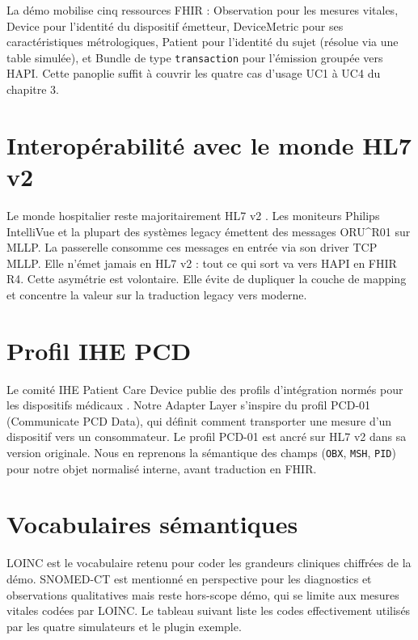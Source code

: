 La démo mobilise cinq ressources FHIR : Observation pour les mesures vitales, Device pour l'identité du dispositif émetteur, DeviceMetric pour ses caractéristiques métrologiques, Patient pour l'identité du sujet (résolue via une table simulée), et Bundle de type \texttt{transaction} pour l'émission groupée vers HAPI. Cette panoplie suffit à couvrir les quatre cas d'usage UC1 à UC4 du chapitre 3.

\section{Interopérabilité avec le monde HL7 v2}
\label{sec:hl7v2-coexistence}

Le monde hospitalier reste majoritairement HL7 v2 \cite{hl7_v2}. Les moniteurs Philips IntelliVue et la plupart des systèmes legacy émettent des messages ORU\textasciicircum{}R01 sur MLLP. La passerelle consomme ces messages en entrée via son driver TCP MLLP. Elle n'émet jamais en HL7 v2 : tout ce qui sort va vers HAPI en FHIR R4. Cette asymétrie est volontaire. Elle évite de dupliquer la couche de mapping et concentre la valeur sur la traduction legacy vers moderne.

\section{Profil IHE PCD}
\label{sec:ihe-pcd}

Le comité IHE Patient Care Device publie des profils d'intégration normés pour les dispositifs médicaux \cite{ihe_pcd_tf}. Notre Adapter Layer s'inspire du profil PCD-01 (Communicate PCD Data), qui définit comment transporter une mesure d'un dispositif vers un consommateur. Le profil PCD-01 est ancré sur HL7 v2 dans sa version originale. Nous en reprenons la sémantique des champs (\texttt{OBX}, \texttt{MSH}, \texttt{PID}) pour notre objet normalisé interne, avant traduction en FHIR.

\section{Vocabulaires sémantiques}
\label{sec:vocabulaires-semantiques}

LOINC est le vocabulaire retenu pour coder les grandeurs cliniques chiffrées de la démo. SNOMED-CT est mentionné en perspective pour les diagnostics et observations qualitatives mais reste hors-scope démo, qui se limite aux mesures vitales codées par LOINC. Le tableau suivant liste les codes effectivement utilisés par les quatre simulateurs et le plugin exemple.

